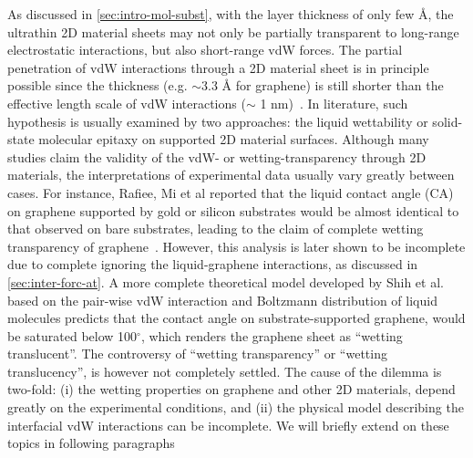 As discussed in \autoref{sec:intro-mol-subst}, with the layer
thickness of only few \AA{}, the ultra\-thin 2D material sheets may
not only be partially transparent to long-range electrostatic
interactions, but also short-range vdW forces.
%
The partial penetration of vdW interactions through a 2D material
sheet is in principle possible since the thickness (e.g. $\sim{}$3.3
\AA{} for graphene) is still shorter than the effective length scale
of vdW interactions ($\sim{}$ 1 nm)~\cite{Israelachvili_2011_book}.
%
In literature, such hypothesis is usually examined by two approaches:
the liquid wettability or solid-state molecular epitaxy on supported
2D material surfaces.
%
Although many studies claim the validity of the vdW- or
wetting-transparency through 2D materials, the interpretations of
experimental data usually vary greatly between cases.
%
For instance, Rafiee, Mi et al reported that the liquid contact angle
(CA) on graphene supported by gold or silicon substrates would be
almost identical to that observed on bare substrates, leading to the
claim of complete wetting transparency of
graphene~\cite{rafiee_wetting_2012}.
%
However, this analysis is later shown to be incomplete due to complete
ignoring the liquid-graphene interactions, as discussed in
\autoref{sec:inter-forc-at}.
%
A more complete theoretical model developed by Shih et
al.~\cite{Shih_2012_prl}  based on the pair-wise
vdW interaction and Boltzmann distribution of liquid molecules
predicts that the contact angle on substrate-supported graphene, would
be saturated below 100$^{\circ}$, which renders the graphene sheet as
``wetting translucent''.
%
The controversy of ``wetting transparency'' or ``wetting
translucency'', is however not completely settled.
%
The cause of the dilemma is two-fold: (i) the wetting properties on
graphene and other 2D materials, depend greatly on the experimental
conditions, and (ii) the physical model describing the interfacial vdW
interactions can be incomplete. We will briefly extend on these topics
in following paragraphs


